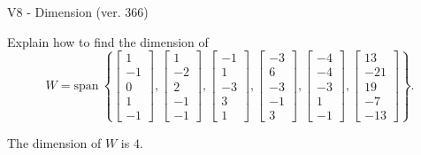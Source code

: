 \begin{exercise}
  \begin{exerciseTitle}V8 - Dimension (ver. 366)\end{exerciseTitle}
  \begin{exerciseStatement}
    Explain how to find the dimension of 
\[W=\mathrm{span}\ \left\{\left[\begin{array}{r}
1 \\
-1 \\
0 \\
1 \\
-1
\end{array}\right] , \left[\begin{array}{r}
1 \\
-2 \\
2 \\
-1 \\
-1
\end{array}\right] , \left[\begin{array}{r}
-1 \\
1 \\
-3 \\
3 \\
1
\end{array}\right] , \left[\begin{array}{r}
-3 \\
6 \\
-3 \\
-1 \\
3
\end{array}\right] , \left[\begin{array}{r}
-4 \\
-4 \\
-3 \\
1 \\
-1
\end{array}\right] , \left[\begin{array}{r}
13 \\
-21 \\
19 \\
-7 \\
-13
\end{array}\right]\right\}.\]



  \end{exerciseStatement}
  \begin{exerciseAnswer}
   The dimension of \(W\) is  \(4\).
  


  \end{exerciseAnswer}
\end{exercise}